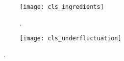 \begin{figure}[!h]
  \centering
  \begin{subfigure}{.48\linewidth}
    \texttt{[image: cls\_ingredients]}
    \caption{.}
  \end{subfigure}
  \begin{subfigure}{.48\linewidth}
    \texttt{[image: cls\_underfluctuation]}
    \caption{}
  \end{subfigure}
  \caption{~\cite{CowanCLsPlots}.}
  \label{fig:cls_method}
\end{figure}
